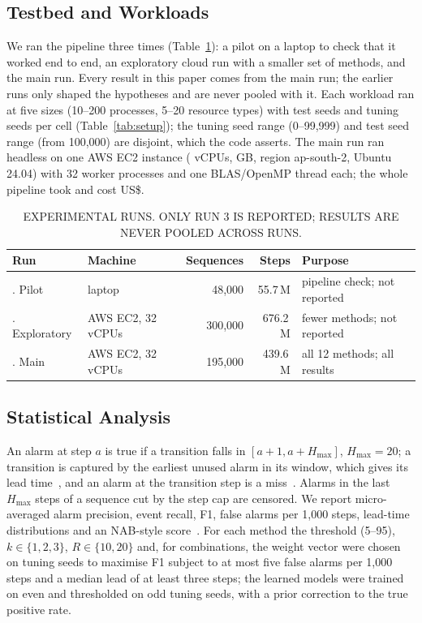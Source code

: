 \documentclass[conference]{IEEEtran}
\begin{document}
\subsection{Testbed and Workloads}\label{sec:testbed}
We ran the pipeline three times (Table~\ref{tab:campaigns}): a pilot on a laptop to check that it worked end to end, an exploratory cloud run with a smaller set of methods, and the main run. Every result in this paper comes from the main run; the earlier runs only shaped the hypotheses and are never pooled with it. Each workload ran at five sizes (10--200 processes, 5--20 resource types) with \NSeedsPerCell{} test seeds and \NSeedsTune{} tuning seeds per cell (Table~\ref{tab:setup}); the tuning seed range (0--99,999) and test seed range (from 100,000) are disjoint, which the code asserts. The main run ran headless on one AWS EC2 \Machine{} instance (\CPUs{} vCPUs, \RamGB{} GB, region ap-south-2, Ubuntu 24.04) with 32 worker processes and one BLAS/OpenMP thread each; the whole pipeline took \AwsWall{} and cost US\$\AwsCost{}.

\begin{table}[t]
\centering\footnotesize
\caption{EXPERIMENTAL RUNS. ONLY RUN 3 IS REPORTED; RESULTS ARE NEVER POOLED ACROSS RUNS.}
\label{tab:campaigns}
\setlength{\tabcolsep}{3pt}\begin{tabular}{>{\raggedright\arraybackslash}p{1.55cm}>{\raggedright\arraybackslash}p{1.35cm}rr>{\raggedright\arraybackslash}p{1.9cm}}
\toprule
Run & Machine & Sequences & Steps & Purpose \\
\midrule
1. Pilot & laptop & 48,000 & 55.7\,M & pipeline check; not reported \\
2. Exploratory & AWS EC2, 32 vCPUs & 300,000 & 676.2\,M & fewer methods; not reported \\
3. Main & AWS EC2, 32 vCPUs & 195,000 & 439.6\,M & all 12 methods; all results \\
\bottomrule
\end{tabular}
\end{table}



\subsection{Statistical Analysis}\label{sec:stats}
An alarm at step $a$ is true if a transition falls in $[a{+}1,a{+}H_{\max}]$, $H_{\max}=20$; a transition is captured by the earliest unused alarm in its window, which gives its lead time~\cite{Hyland2020}, and an alarm at the transition step is a miss~\cite{Munchmeyer2021}. Alarms in the last $H_{\max}$ steps of a sequence cut by the step cap are censored. We report micro-averaged alarm precision, event recall, F1, false alarms per 1,000 steps, lead-time distributions and an NAB-style score~\cite{Lavin2015}. For each method the threshold (5--95), $k\in\{1,2,3\}$, $R\in\{10,20\}$ and, for combinations, the weight vector were chosen on tuning seeds to maximise F1 subject to at most five false alarms per 1,000 steps and a median lead of at least three steps; the learned models were trained on even and thresholded on odd tuning seeds, with a prior correction to the true positive rate.
\end{document}
